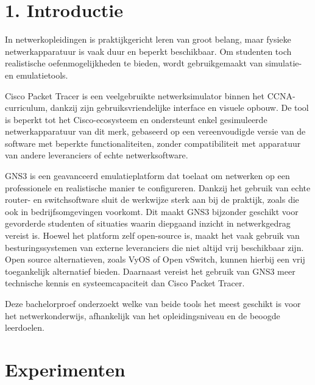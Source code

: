 \documentclass[a0,portrait]{hogent-poster}
\begin{document}
\begin{multicols}{2} %

\section*{\LARGE 1. Introductie}


In netwerkopleidingen is praktijkgericht leren van groot belang, maar fysieke netwerkapparatuur is vaak duur en beperkt beschikbaar. Om studenten toch realistische oefenmogelijkheden te bieden, wordt gebruikgemaakt van simulatie- en emulatietools. 

\vspace{0.3cm}

Cisco Packet Tracer is een veelgebruikte netwerksimulator binnen het CCNA-curriculum, dankzij zijn gebruiksvriendelijke interface en visuele opbouw. De tool is beperkt tot het Cisco-ecosysteem en ondersteunt enkel gesimuleerde netwerkapparatuur van dit merk, gebaseerd op een vereenvoudigde versie van de software met beperkte functionaliteiten, zonder compatibiliteit met apparatuur van andere leveranciers of echte netwerksoftware.

\vspace{0.3cm}

 GNS3 is een geavanceerd emulatieplatform dat toelaat om netwerken op een professionele en realistische manier te configureren. Dankzij het gebruik van echte router- en switchsoftware sluit de werkwijze sterk aan bij de praktijk, zoals die ook in bedrijfsomgevingen voorkomt. Dit maakt GNS3 bijzonder geschikt voor gevorderde studenten of situaties waarin diepgaand inzicht in netwerkgedrag vereist is. Hoewel het platform zelf open-source is, maakt het vaak gebruik van besturingssystemen van externe leveranciers die niet altijd vrij beschikbaar zijn. Open source alternatieven, zoals VyOS of Open vSwitch, kunnen hierbij een vrij toegankelijk alternatief bieden. Daarnaast vereist het gebruik van GNS3 meer technische kennis en systeemcapaciteit dan Cisco Packet Tracer.
 
 \vspace{0.3cm}
 
  Deze bachelorproef onderzoekt welke van beide tools het meest geschikt is voor het netwerkonderwijs, afhankelijk van het opleidingsniveau en de beoogde leerdoelen.

\section{Experimenten}


\end{multicols}
\end{document}
